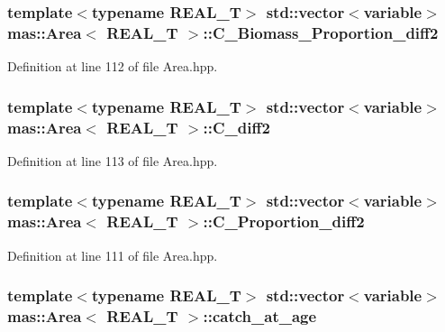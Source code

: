 \hypertarget{structmas_1_1_area_ad0afc58b6fcbd08ddceaa9f1db430bdd}{
\subsubsection[{C\-\_\-\-Biomass\-\_\-\-Proportion\-\_\-diff2}]{\setlength{\rightskip}{0pt plus 5cm}template$<$typename R\-E\-A\-L\-\_\-\-T$>$ std\-::vector$<${\bf variable}$>$ {\bf mas\-::\-Area}$<$ R\-E\-A\-L\-\_\-\-T $>$\-::C\-\_\-\-Biomass\-\_\-\-Proportion\-\_\-diff2}}\label{structmas_1_1_area_ad0afc58b6fcbd08ddceaa9f1db430bdd}


Definition at line 112 of file Area.\-hpp.

\hypertarget{structmas_1_1_area_a0144a4142a67be22d63290f836eb3961}{
\subsubsection[{C\-\_\-diff2}]{\setlength{\rightskip}{0pt plus 5cm}template$<$typename R\-E\-A\-L\-\_\-\-T$>$ std\-::vector$<${\bf variable}$>$ {\bf mas\-::\-Area}$<$ R\-E\-A\-L\-\_\-\-T $>$\-::C\-\_\-diff2}}\label{structmas_1_1_area_a0144a4142a67be22d63290f836eb3961}


Definition at line 113 of file Area.\-hpp.

\hypertarget{structmas_1_1_area_a3f51d606be9b45fe96667507434dc690}{
\subsubsection[{C\-\_\-\-Proportion\-\_\-diff2}]{\setlength{\rightskip}{0pt plus 5cm}template$<$typename R\-E\-A\-L\-\_\-\-T$>$ std\-::vector$<${\bf variable}$>$ {\bf mas\-::\-Area}$<$ R\-E\-A\-L\-\_\-\-T $>$\-::C\-\_\-\-Proportion\-\_\-diff2}}\label{structmas_1_1_area_a3f51d606be9b45fe96667507434dc690}


Definition at line 111 of file Area.\-hpp.

\hypertarget{structmas_1_1_area_a1a1735c4520ba32f042d753486914fe6}{
\subsubsection[{catch\-\_\-at\-\_\-age}]{\setlength{\rightskip}{0pt plus 5cm}template$<$typename R\-E\-A\-L\-\_\-\-T$>$ std\-::vector$<${\bf variable}$>$ {\bf mas\-::\-Area}$<$ R\-E\-A\-L\-\_\-\-T $>$\-::catch\-\_\-at\-\_\-age}}\label{structmas_1_1_area_a1a1735c4520ba32f042d753486914fe6}


